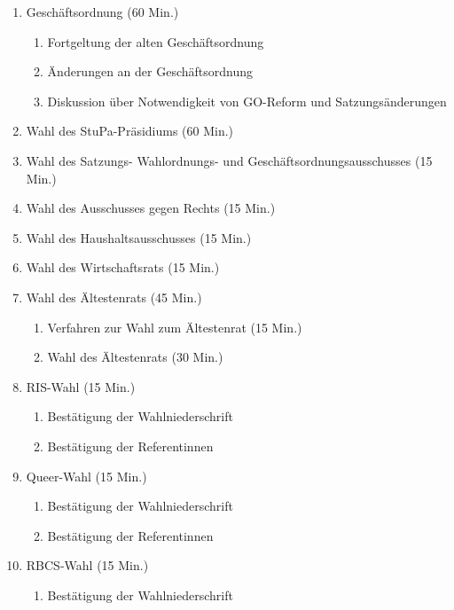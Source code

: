 \documentclass[ngerman,headheight=70pt]{scrartcl}
\begin{document}
    \begin{enumerate}[label={\textbf{Top \theenumi}},leftmargin=*]
        \item Geschäftsordnung (60 Min.)
            \begin{enumerate}
                \item Fortgeltung der alten Geschäftsordnung
                \item Änderungen an der Geschäftsordnung
                \item Diskussion über Notwendigkeit von GO-Reform und Satzungsänderungen
            \end{enumerate}
        \item Wahl des StuPa-Präsidiums (60 Min.)
        \item Wahl des Satzungs- Wahlordnungs- und  Geschäftsordnungsausschusses (15 Min.)
        \item Wahl des Ausschusses gegen Rechts (15 Min.)
        \item Wahl des Haushaltsausschusses (15 Min.)
        \item Wahl des Wirtschaftsrats (15 Min.)
        \item Wahl des Ältestenrats (45 Min.)
            \begin{enumerate}
                \item Verfahren zur Wahl zum Ältestenrat (15 Min.)
                \item Wahl des Ältestenrats (30 Min.)
            \end{enumerate}
        \item RIS-Wahl (15 Min.)
            \begin{enumerate}
                \item Bestätigung der Wahlniederschrift
                \item Bestätigung der Referentinnen
            \end{enumerate}
        \item Queer-Wahl (15 Min.)
            \begin{enumerate}
                \item Bestätigung der Wahlniederschrift
                \item Bestätigung der Referentinnen
            \end{enumerate}
        \item RBCS-Wahl (15 Min.)
            \begin{enumerate}
                \item Bestätigung der Wahlniederschrift

\end{enumerate}
\end{enumerate}
\end{document}
